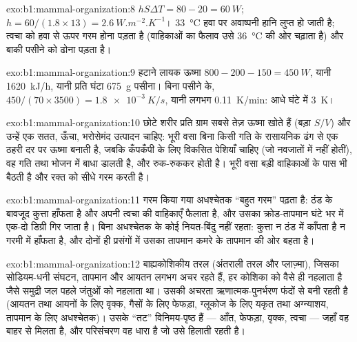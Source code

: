 \begin{solution}{exo:b1:mammal-organization:8}
$hS\Delta T = 80 - 20 = \qty{60}{W}$; $h = 60/(1.8\times 13) =
\qty{2.6}{W.m^{-2}.K^{-1}}$। \qty{33}{\celsius} हवा पर
अवाष्पनी हानि लुप्त हो जाती है; त्वचा को हवा से ऊपर गरम होना पड़ता है
(वाहिकाओं का फैलाव उसे \qty{36}{\celsius} की ओर चढ़ाता है) और बाकी पसीने
को ढोना पड़ता है।
\end{solution}

\begin{solution}{exo:b1:mammal-organization:9}
हटाने लायक ऊष्मा $800 - 200 - 150 = \qty{450}{W}$, यानी \qty{1620}{kJ/h},
यानी प्रति घंटा \qty{675}{g} पसीना। बिना पसीने के, $450/(70\times 3500) =
\qty{1.8e-3}{K/s}$, यानी लगभग \qty{0.11}{K/min}: आधे घंटे में \qty{3}{K}।
\end{solution}

\begin{solution}{exo:b1:mammal-organization:10}
छोटे शरीर प्रति ग्राम सबसे तेज़ ऊष्मा खोते हैं (बड़ा $S/V$) और उन्हें एक
सतत, ऊँचा, भरोसेमंद उत्पादन चाहिए: भूरी वसा बिना किसी गति के रासायनिक ढंग
से एक ठहरी दर पर ऊष्मा बनाती है, जबकि कँपकँपी के लिए विकसित पेशियाँ चाहिए
(जो नवजातों में नहीं होतीं), वह गति तथा भोजन में बाधा डालती है, और
रुक-रुककर होती है। भूरी वसा बड़ी वाहिकाओं के पास भी बैठती है और रक्त को
सीधे गरम करती है।
\end{solution}

\begin{solution}{exo:b1:mammal-organization:11}
गरम किया गया अधश्चेतक ``बहुत गरम'' पढ़ता है: ठंड के बावजूद कुत्ता हाँफता
है और अपनी त्वचा की वाहिकाएँ फैलाता है, और उसका क्रोड-तापमान घंटे भर में
एक-दो डिग्री गिर जाता है। बिना अधश्चेतक के कोई नियत-बिंदु नहीं रहता:
कुत्ता न ठंड में काँपता है न गरमी में हाँफता है, और दोनों ही प्रसंगों में
उसका तापमान कमरे के तापमान की ओर बहता है।
\end{solution}

\begin{solution}{exo:b1:mammal-organization:12}
बाह्यकोशिकीय तरल (अंतराली तरल और प्लाज़्मा), जिसका सोडियम-धनी संघटन,
तापमान और आयतन लगभग अचर रहते हैं, हर कोशिका को वैसे ही नहलाता है जैसे
समुद्री जल पहले जंतुओं को नहलाता था। उसकी अचरता ऋणात्मक-पुनर्भरण फंदों से
बनी रहती है (आयतन तथा आयनों के लिए वृक्क, गैसों के लिए फेफड़ा, ग्लूकोज के
लिए यकृत तथा अग्न्याशय, तापमान के लिए अधश्चेतक)। उसके ``तट'' विनिमय-पृष्ठ
हैं --- आँत, फेफड़ा, वृक्क, त्वचा --- जहाँ वह बाहर से मिलता है, और
परिसंचरण वह धारा है जो उसे हिलाती रहती है।
\end{solution}

